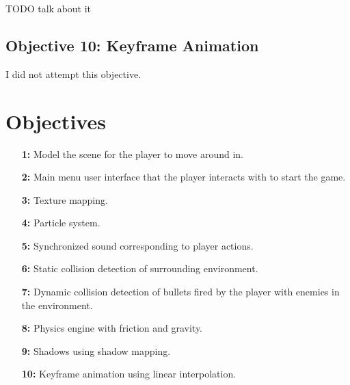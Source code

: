 \documentclass {article}
\begin{document}
TODO talk about it


\subsection{Objective 10: Keyframe Animation}
I did not attempt this objective.


\newpage
\printbibliography[heading=bibintoc, title={References}] %

\newpage
\appendix
\section{Objectives}\label{sec:objectives}
\begin{enumerate}
    \item[\textbf{1:}]
    Model the scene for the player to move around in.

    \item[\textbf{2:}]
    Main menu user interface that the player interacts with to start the game.

    \item[\textbf{3:}]
    Texture mapping.

    \item[\textbf{4:}]
    Particle system.

    \item[\textbf{5:}]
    Synchronized sound corresponding to player actions.

    \item[\textbf{6:}]
    Static collision detection of surrounding environment.

    \item[\textbf{7:}]
    Dynamic collision detection of bullets fired by the player with enemies in the environment.

    \item[\textbf{8:}]
    Physics engine with friction and gravity.

    \item[\textbf{9:}]
    Shadows using shadow mapping.

    \item[\textbf{10:}]
    Keyframe animation using linear interpolation.
\end{enumerate}
\end{document}
